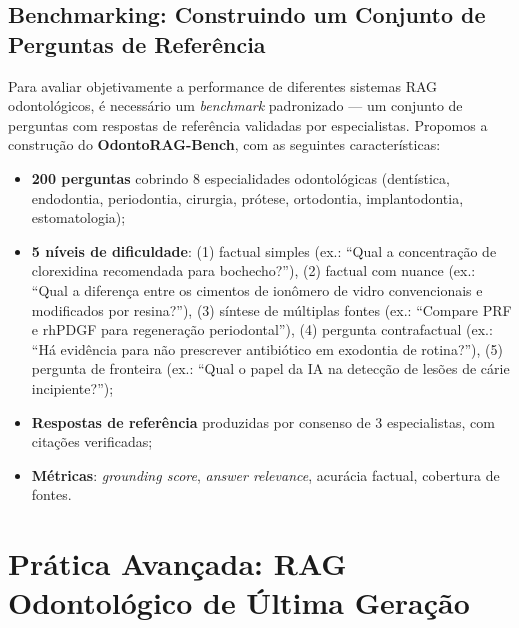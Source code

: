 \subsection{Benchmarking: Construindo um Conjunto de Perguntas de Referência}

Para avaliar objetivamente a performance de diferentes sistemas RAG odontológicos, é necessário um \textit{benchmark} padronizado --- um conjunto de perguntas com respostas de referência validadas por especialistas. Propomos a construção do \textbf{OdontoRAG-Bench}, com as seguintes características:

\begin{itemize}
    \item \textbf{200 perguntas} cobrindo 8 especialidades odontológicas (dentística, endodontia, periodontia, cirurgia, prótese, ortodontia, implantodontia, estomatologia);
    \item \textbf{5 níveis de dificuldade}: (1) factual simples (ex.: ``Qual a concentração de clorexidina recomendada para bochecho?''), (2) factual com nuance (ex.: ``Qual a diferença entre os cimentos de ionômero de vidro convencionais e modificados por resina?''), (3) síntese de múltiplas fontes (ex.: ``Compare PRF e rhPDGF para regeneração periodontal''), (4) pergunta contrafactual (ex.: ``Há evidência para não prescrever antibiótico em exodontia de rotina?''), (5) pergunta de fronteira (ex.: ``Qual o papel da IA na detecção de lesões de cárie incipiente?'');

    \item \textbf{Respostas de referência} produzidas por consenso de 3 especialistas, com citações verificadas;

    \item \textbf{Métricas}: \textit{grounding score}, \textit{answer relevance}, acurácia factual, cobertura de fontes.
\end{itemize}

\section{Prática Avançada: RAG Odontológico de Última Geração}

